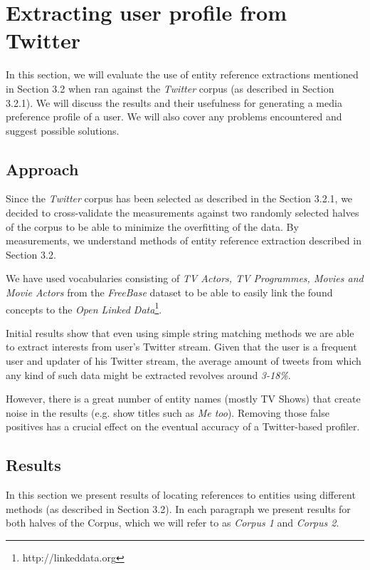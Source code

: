 \section{Extracting user profile from Twitter}

In this section, we will evaluate the use of entity reference extractions
mentioned in Section 3.2 when ran against the \textit{Twitter} corpus (as described in Section 3.2.1).
We will discuss the results and their usefulness for generating a media preference profile of a user.
We will also cover any problems encountered and suggest possible solutions.

\subsection{Approach}
Since the \textit{Twitter} corpus has been selected as described in the Section 3.2.1,
we decided to cross-validate the measurements against two randomly selected halves of the corpus
to be able to minimize the overfitting of the data. By measurements, we understand methods of
entity reference extraction described in Section 3.2.

We have used vocabularies consisting of \textit{TV Actors, TV Programmes, Movies and Movie Actors} from
the \textit{FreeBase} dataset to be able to easily link the found concepts to the \textit{Open Linked Data}\footnote{http://linkeddata.org}.

Initial results show that even using simple string matching methods we are able to extract interests from
user's Twitter stream. Given that the user is a frequent user and updater of his Twitter stream, the average amount of tweets from which any kind of such data might be extracted revolves around \textit{3-18\%}.

However, there is a great number of entity names (mostly TV Shows) that create noise in the results (e.g. show titles such as \textit{Me too}). Removing those false positives has a crucial effect on the eventual accuracy of a Twitter-based profiler.

\subsection{Results}
In this section we present results of locating references to entities using different methods (as described in Section 3.2).
In each paragraph we present results for both halves of the Corpus, which we will refer to as \textit{Corpus 1} and
\textit{Corpus 2}.

